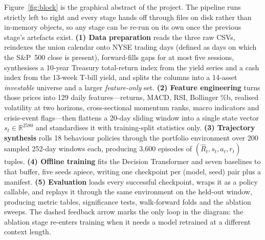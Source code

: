 \documentclass[11pt]{article}
\begin{document}
Figure~\ref{fig:block} is the graphical abstract of the project. The pipeline runs strictly
left to right and every stage hands off through files on disk rather than in-memory objects,
so any stage can be re-run on its own once the previous stage's artefacts exist.
\textbf{(1) Data preparation} reads the three raw CSVs, reindexes the union calendar onto NYSE
trading days (defined as days on which the S\&P~500 close is present), forward-fills gaps for
at most five sessions, synthesises a 10-year Treasury total-return index from the yield
series and a cash index from the 13-week T-bill yield, and splits the columns into a
14-asset \emph{investable} universe and a larger \emph{feature-only} set.
\textbf{(2) Feature engineering} turns those prices into 129 daily features---returns, MACD,
RSI, Bollinger \%b, realised volatility at two horizons, cross-sectional momentum ranks,
macro indicators and crisis-event flags---then flattens a 20-day sliding window into a single
state vector $s_t \in \mathbb{R}^{2580}$ and standardises it with training-split statistics
only. \textbf{(3) Trajectory synthesis} rolls 18 behaviour policies through the portfolio
environment over 200 sampled 252-day windows each, producing 3{,}600 episodes of
$(\hat{R}_t, s_t, a_t, r_t)$ tuples. \textbf{(4) Offline training} fits the Decision
Transformer and seven baselines to that buffer, five seeds apiece, writing one checkpoint per
(model, seed) pair plus a manifest. \textbf{(5) Evaluation} loads every successful checkpoint,
wraps it as a policy callable, and replays it through the same environment on the held-out
window, producing metric tables, significance tests, walk-forward folds and the ablation
sweeps. The dashed feedback arrow marks the only loop in the diagram: the ablation stage
re-enters training when it needs a model retrained at a different context length.
\end{document}
